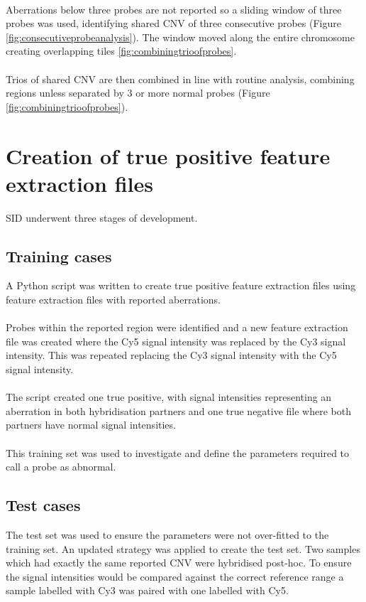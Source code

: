 \paragraph*{}
Aberrations below three probes are not reported so a sliding window of three probes was used, identifying shared CNV of three consecutive probes (Figure \ref{fig:consecutiveprobeanalysis}). The window moved along the entire chromosome creating overlapping tiles \ref{fig:combiningtrioofprobes}.

\paragraph*{}
Trios of shared CNV are then combined in line with routine analysis, combining regions unless separated by 3 or more normal probes (Figure \ref{fig:combiningtrioofprobes}).
\section{Creation of true positive feature extraction files}
SID underwent three stages of development.
\subsection{Training cases}
A Python script was written to create true positive feature extraction files using feature extraction files with reported aberrations. 
\paragraph*{}
Probes within the reported region were identified and a new feature extraction file was created where the Cy5 signal intensity was replaced by the Cy3 signal intensity. This was repeated replacing the Cy3 signal intensity with the Cy5 signal intensity.
\paragraph*{}
The script created one true positive, with signal intensities representing an aberration in both hybridisation partners and one true negative file where both partners have normal signal intensities.
\paragraph*{}
This training set was used to investigate and define the parameters required to call a probe as abnormal. 
\subsection{Test cases}
The test set was used to ensure the parameters were not over-fitted to the training set. An updated strategy was applied to create the test set. Two samples which had exactly the same reported CNV were hybridised post-hoc. 
To ensure the signal intensities would be compared against the correct reference range a sample labelled with Cy3 was paired with one labelled with Cy5. 
